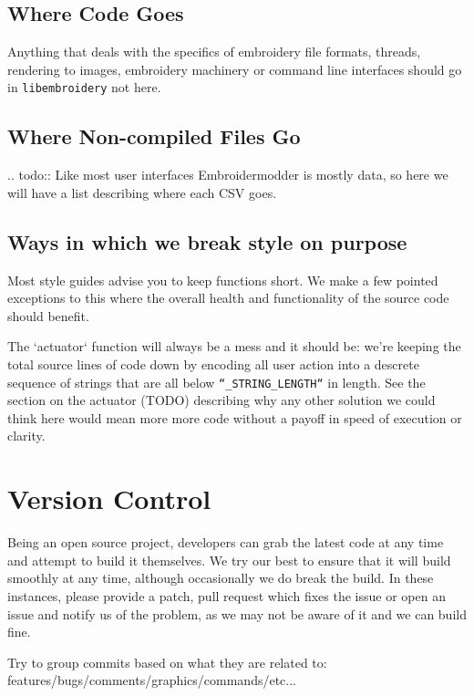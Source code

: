 \documentclass[a4paper]{report}
\begin{document}
\subsection{Where Code Goes}

Anything that deals with the specifics of embroidery file formats, threads,
rendering to images, embroidery machinery or command line interfaces should go 
in \texttt{libembroidery} not here.

\subsection{Where Non-compiled Files Go}

.. todo::
   Like most user interfaces Embroidermodder is mostly data,
   so here we will have a list describing where each CSV goes.

\subsection{Ways in which we break style on purpose}

Most style guides advise you to keep functions short. We make a few pointed
exceptions to this where the overall health and functionality of the source code should benefit.

The `actuator` function will always be a mess and it should be: we're keeping
the total source lines of code down by encoding all user action into a descrete
sequence of strings that are all below \texttt{``\_STRING\_LENGTH``} in length. See
the section on the actuator (TODO) describing why any other solution we could
think  here would mean more more code without a payoff in speed of execution or
clarity.

\section{Version Control}

Being an open source project, developers can grab the latest code at any time and attempt to build it themselves. We try our best to ensure that it will build smoothly at any time, although occasionally we do break the build. In these instances, please provide a patch, pull request which fixes the issue or open an issue and notify us of the problem, as we may not be aware of it and we can build fine.

Try to group commits based on what they are related to: features/bugs/comments/graphics/commands/etc...
\end{document}
